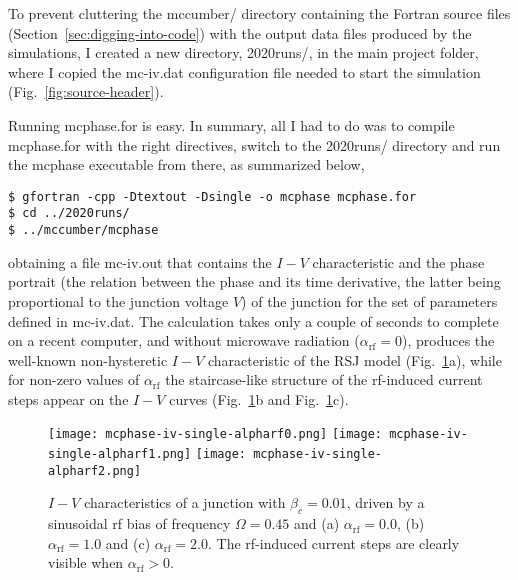 To prevent cluttering the \textsf{mccumber/} directory containing the Fortran source files (Section~\ref{sec:digging-into-code}) with the output data files produced by the simulations, I created  a new directory, \textsf{2020runs/}, in the main project folder, where I copied the \textsf{mc-iv.dat} configuration file needed to start the simulation (Fig.~\ref{fig:source-header}).

Running \textsf{mcphase.for} is easy. In summary, all I had to do was to compile \textsf{mcphase.for} with the right directives, switch to the \textsf{2020runs/} directory and run the \textsf{mcphase} executable from there, as summarized below,

\begin{lstlisting}
$ gfortran -cpp -Dtextout -Dsingle -o mcphase mcphase.for
$ cd ../2020runs/
$ ../mccumber/mcphase
\end{lstlisting}

obtaining a file \textsf{mc-iv.out} that contains the $I - V$ characteristic and the phase portrait (the relation between the phase and its time derivative, the latter being proportional to the junction voltage $V$) of the junction for the set of parameters defined in \textsf{mc-iv.dat}. 
The calculation takes only a couple of seconds to complete on a recent computer, and without microwave radiation ($\alpha_\mathrm{rf} = 0$), produces the well-known non-hysteretic $I - V$ characteristic of the RSJ model (Fig.~\ref{fig:mcphase-iv-single}a), while for non-zero values of $\alpha_\mathrm{rf}$ the staircase-like structure of the rf-induced current steps appear on the $I - V$ curves (Fig.~\ref{fig:mcphase-iv-single}b and Fig.~\ref{fig:mcphase-iv-single}c).

\begin{figure}[bh]
{
	\fboxsep=0pt
	\mbox{\texttt{[image: mcphase-iv-single-alpharf0.png]}}
	\hfill
	\mbox{\texttt{[image: mcphase-iv-single-alpharf1.png]}}
	\hfill
	\mbox{\texttt{[image: mcphase-iv-single-alpharf2.png]}}
}
	\caption{$I - V$ characteristics of a junction with $\beta_c = 0.01$, driven by a sinusoidal rf bias of frequency $\Omega = 0.45$ and (a) $\alpha_\mathrm{rf} = 0.0$, (b) $\alpha_\mathrm{rf} = 1.0$ and (c) $\alpha_\mathrm{rf} = 2.0$. The rf-induced current steps are clearly visible when $\alpha_\mathrm{rf} > 0$.}
	\label{fig:mcphase-iv-single}
\end{figure}


